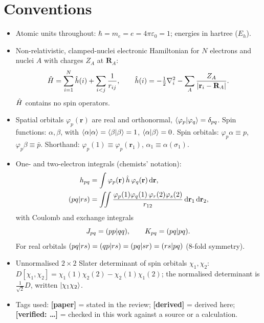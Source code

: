 \section{Conventions}\label{sec:conv}

\begin{itemize}
  \item Atomic units throughout: $\hbar=m_e=e=4\pi\varepsilon_0=1$; energies in hartree ($E_h$).
  \item Non-relativistic, clamped-nuclei electronic Hamiltonian for $N$ electrons and nuclei $A$ with
        charges $Z_A$ at $\mathbf R_A$:
        \begin{equation}\label{eq:H}
          \hat H=\sum_{i=1}^{N}\hat h(i)+\sum_{i<j}\frac{1}{r_{ij}},\qquad
          \hat h(i)=-\tfrac12\nabla_i^2-\sum_A\frac{Z_A}{|\mathbf r_i-\mathbf R_A|}.
        \end{equation}
        $\hat H$ contains no spin operators.
  \item Spatial orbitals $\varphi_p(\mathbf r)$ are real and orthonormal, $\langle \varphi_p\vert \varphi_q\rangle=\delta_{pq}$.
        Spin functions: $\alpha,\beta$, with $\langle \alpha\vert \alpha\rangle=\langle \beta\vert \beta\rangle=1$, $\langle \alpha\vert \beta\rangle=0$.
        Spin orbitals: $\varphi_p\alpha\equiv p$, $\varphi_p\beta\equiv\bar p$.
        Shorthand: $\varphi_p(1)\equiv\varphi_p(\mathbf r_1)$, $\alpha_1\equiv\alpha(\sigma_1)$.
  \item One- and two-electron integrals (chemists' notation):
        \begin{align}
          h_{pq}&=\int\varphi_p(\mathbf r)\,\hat h\,\varphi_q(\mathbf r)\,\mathrm d\mathbf r,\\
          (pq\vert rs)&=\iint\frac{\varphi_p(1)\varphi_q(1)\,\varphi_r(2)\varphi_s(2)}{r_{12}}\,\mathrm d\mathbf r_1\,\mathrm d\mathbf r_2,
        \end{align}
        with Coulomb and exchange integrals
        \begin{equation}\label{eq:JK}
          J_{pq}=(pp\vert qq),\qquad K_{pq}=(pq\vert pq) .
        \end{equation}
        For real orbitals $(pq\vert rs)=(qp\vert rs)=(pq\vert sr)=(rs\vert pq)$ (8-fold symmetry).
  \item Unnormalised $2\times2$ Slater determinant of spin orbitals $\chi_1,\chi_2$:
        $D[\chi_1,\chi_2]=\chi_1(1)\chi_2(2)-\chi_2(1)\chi_1(2)$; the normalised determinant is
        $\tfrac1{\sqrt2}D$, written $\lvert \chi_1\chi_2\rangle$.
  \item Tags used: \textbf{[paper]} = stated in the review; \textbf{[derived]} = derived here;
        \textbf{[verified: \dots]} = checked in this work against a source or a calculation.
\end{itemize}
